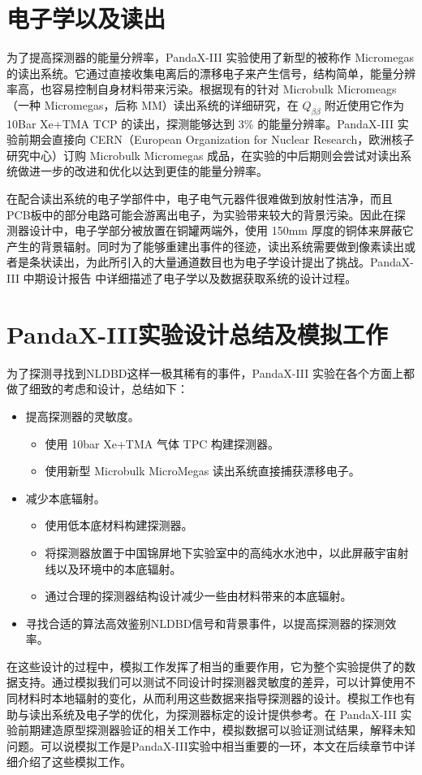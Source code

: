 \section{电子学以及读出}

为了提高探测器的能量分辨率，PandaX-III 实验使用了新型的被称作 Micromegas 的读出系统。它通过直接收集电离后的漂移电子来产生信号，结构简单，能量分辨率高，也容易控制自身材料带来污染。根据现有的针对 Microbulk Micromeags（一种 Micromegas，后称 MM）读出系统的详细研究，在 $Q_{\beta\beta}$ 附近使用它作为 10Bar Xe+TMA TCP 的读出，探测能够达到 3\% 的能量分辨率。PandaX-III 实验前期会直接向 CERN（European Organization for Nuclear Research，欧洲核子研究中心）订购 Microbulk Micromegas 成品，在实验的中后期则会尝试对读出系统做进一步的改进和优化以达到更佳的能量分辨率\supercite{cdr}。

在配合读出系统的电子学部件中，电子电气元器件很难做到放射性洁净，而且PCB板中的部分电路可能会游离出电子，为实验带来较大的背景污染。因此在探测器设计中，电子学部分被放置在铜罐两端外，使用 150mm 厚度的铜体来屏蔽它产生的背景辐射。同时为了能够重建出事件的径迹，读出系统需要做到像素读出或者是条状读出，为此所引入的大量通道数目也为电子学设计提出了挑战。PandaX-III 中期设计报告\supercite{cdr} 中详细描述了电子学以及数据获取系统的设计过程。

\section{PandaX-III实验设计总结及模拟工作}

为了探测寻找到NLDBD这样一极其稀有的事件，PandaX-III 实验在各个方面上都做了细致的考虑和设计，总结如下：

\vspace{0.4cm}

\begin{itemize}
    \item 提高探测器的灵敏度。
    \begin{itemize}
        \item 使用 10bar Xe+TMA 气体 TPC 构建探测器。
        \item 使用新型 Microbulk MicroMegas 读出系统直接捕获漂移电子。
    \end{itemize}
    \item 减少本底辐射。
    \begin{itemize}
        \item 使用低本底材料构建探测器。
        \item 将探测器放置于中国锦屏地下实验室中的高纯水水池中，以此屏蔽宇宙射线以及环境中的本底辐射。
        \item 通过合理的探测器结构设计减少一些由材料带来的本底辐射。
    \end{itemize}
    \item 寻找合适的算法高效鉴别NLDBD信号和背景事件，以提高探测器的探测效率。
\end{itemize}

\vspace{0.4cm}

在这些设计的过程中，模拟工作发挥了相当的重要作用，它为整个实验提供了的数据支持。通过模拟我们可以测试不同设计时探测器灵敏度的差异，可以计算使用不同材料时本地辐射的变化，从而利用这些数据来指导探测器的设计。模拟工作也有助与读出系统及电子学的优化，为探测器标定的设计提供参考。在 PandaX-III 实验前期建造原型探测器验证的相关工作中，模拟数据可以验证测试结果，解释未知问题。可以说模拟工作是PandaX-III实验中相当重要的一环，本文在后续章节中详细介绍了这些模拟工作。

